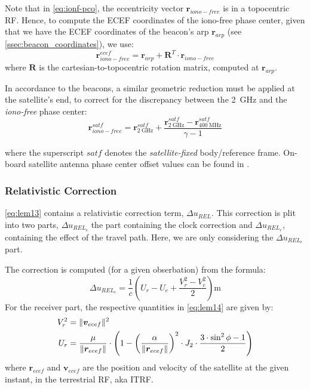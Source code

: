Note that in \ref{eq:ionf-pco}, the eccentricity vector $\bm{r}_{iono-free}$ 
is in a topocentric RF. Hence, to compute the ECEF coordinates of the 
iono-free phase center, given that we have the ECEF coordinates of the beacon's 
\gls{arp} $\bm{r}_{arp}$ (see \ref{ssec:beacon_coordinates}), we use:
\begin{equation}
  \bm{r}^{ecef}_{iono-free} = \bm{r}_{arp} + \bm{R}^T \cdot \bm{r}_{iono-free}
  \label{eq:arp-to-if-pc}
\end{equation}
where $\bm{R}$ is the cartesian-to-topocentric rotation matrix, computed 
at $\bm{r}_{arp}$.

In accordance to the beacons, a similar geometric reduction must be applied 
at the satellite's end, to correct for the discrepancy between the \SI{2}{\GHz} 
and the \emph{iono-free} phase center:
\begin{equation}
  \bm{r}^{satf}_{iono-free} = \bm{r}^{satf}_{\SI{2}{\GHz}} + 
    \frac{\bm{r}^{satf}_{\SI{2}{\GHz}} - 
    \bm{r}^{satf}_{\SI{400}{\MHz}}}{\gamma - 1}
\end{equation}

where the superscript $satf$ denotes the \emph{satellite-fixed} body/reference 
frame. On-board satellite antenna phase center offset values can be found in 
\cite{DorisSatModels}.

\subsubsection{Relativistic Correction}
\label{sssec:relativistic-correction}
\ref{eq:lem13} contains a relativistic correction term, $\Delta u_{REL}$. This 
correction is plit into two parts, $\Delta u_{REL_c}$ the part containing the 
clock correction and $\Delta u_{REL_r}$, containing the effect of the travel 
path. Here, we are only considering the $\Delta u_{REL_c}$ part.

The correction is computed (for a given obserbation) from the formula:
\begin{equation}
  \Delta u_{REL_c} = \frac{1}{c} \left( U_r - U_e + \frac{V^2_r - V^2_e}{2} \right) \si{\m}
  \label{eq:lem14}
\end{equation}
For the receiver part, the respective quantities in \ref{eq:lem14} are given by:
\begin{equation}
  \begin{aligned}
    V^2_r &= \lVert\bm{v}_{ecef}\rVert^2 \\
    U_r   &= \frac{\mu}{\lVert\bm{r}_{ecef}\rVert} \cdot \left( 1 - 
      \left(\frac{\alpha}{\lVert\bm{r}_{ecef}\rVert}\right) ^2 \cdot J_2 \cdot
        \frac{3 \cdot \sin ^2{\phi} -1}{2} \right)
  \end{aligned}
  \label{eq:potential-receiver}
\end{equation}
where $\bm{r}_{ecef}$ and $\bm{v}_{ecef}$ are the position and velocity of the 
satellite at the given instant, in the terrestrial RF, aka ITRF.


